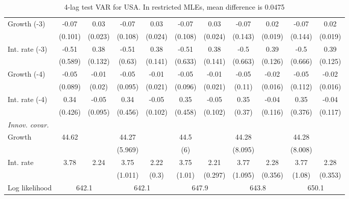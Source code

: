 \begin{table}[htbp]
\begin{tabular}{@{\extracolsep{4pt}}lcccccccccc@{}}
\quad Growth (-3) 	 &-0.07 	 & 0.03 	 & -0.07 	 & 0.03 	 & -0.07 	 & 0.03 	 & -0.07 	 & 0.02 	 & -0.07 	 & 0.02	 \\ 
 		 & (0.101) 	 & (0.023) 	 & (0.108) 	 & (0.024) 	 & (0.108) 	 & (0.024) 	 & (0.143) 	 & (0.019) 	 & (0.144) 	 & (0.019) 	 \\ 
\quad Int. rate (-3) 	 &-0.51 	 & 0.38 	 & -0.51 	 & 0.38 	 & -0.51 	 & 0.38 	 & -0.5 	 & 0.39 	 & -0.5 	 & 0.39	 \\ 
 		 & (0.589) 	 & (0.132) 	 & (0.63) 	 & (0.141) 	 & (0.633) 	 & (0.141) 	 & (0.663) 	 & (0.126) 	 & (0.666) 	 & (0.125) 	 \\ 
\quad Growth (-4) 	 &-0.05 	 & -0.01 	 & -0.05 	 & -0.01 	 & -0.05 	 & -0.01 	 & -0.05 	 & -0.02 	 & -0.05 	 & -0.02	 \\ 
 		 & (0.089) 	 & (0.02) 	 & (0.095) 	 & (0.021) 	 & (0.096) 	 & (0.021) 	 & (0.11) 	 & (0.016) 	 & (0.112) 	 & (0.016) 	 \\ 
\quad Int. rate (-4) 	 &0.34 	 & -0.05 	 & 0.34 	 & -0.05 	 & 0.35 	 & -0.05 	 & 0.35 	 & -0.04 	 & 0.35 	 & -0.04	 \\ 
 		 & (0.426) 	 & (0.095) 	 & (0.456) 	 & (0.102) 	 & (0.458) 	 & (0.102) 	 & (0.37) 	 & (0.116) 	 & (0.376) 	 & (0.117) 	 \\ 
\rule{0pt}{4ex} \emph{Innov. covar.}  	 & 	 & 	 & 	 & 	 & 	 & 	 & 	 & 	 & 	 &\\ 
\quad Growth 	 &44.62 	 &  	 & 44.27 	 &  	 & 44.5 	 &  	 & 44.28 	 &  	 & 44.28 	 & 	 \\ 
 		 &  	 &  	 & (5.969) 	 &  	 & (6) 	 &  	 & (8.095) 	 &  	 & (8.008) 	 &  	 \\ 
\quad Int. rate 	 &3.78 	 & 2.24 	 & 3.75 	 & 2.22 	 & 3.75 	 & 2.21 	 & 3.77 	 & 2.28 	 & 3.77 	 & 2.28	 \\ 
 		 &  	 &  	 & (1.011) 	 & (0.3) 	 & (1.01) 	 & (0.297) 	 & (1.095) 	 & (0.356) 	 & (1.08) 	 & (0.353) 	 \\ 
 \hline \rule{0pt}{4ex} 
  Log likelihood 	 &\multicolumn{2}{c}{642.1} 	 & \multicolumn{2}{c}{642.1} 	 & \multicolumn{2}{c}{647.9} 	 & \multicolumn{2}{c}{643.8} 	 & \multicolumn{2}{c}{650.1}\\ 

 \hline 	\end{tabular}		\caption{4-lag test VAR for USA. In restricted MLEs, mean difference is 0.0475}
		\label{tab:USA4lag}

\end{table}